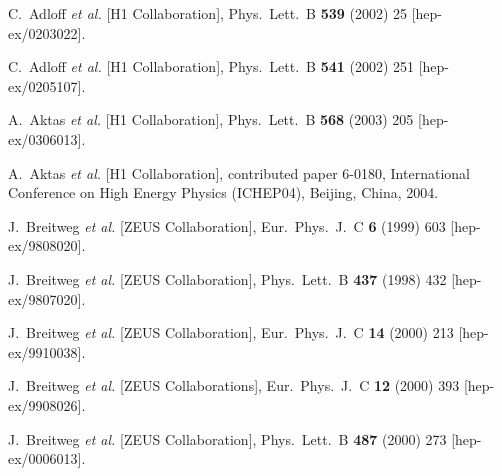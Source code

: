 \begin{thebibliography}{999}
C.~Adloff {\it et al.}  [H1 Collaboration],
Phys.\ Lett.\ B {\bf 539} (2002) 25 
[hep-ex/0203022].

C.~Adloff {\it et al.}  [H1 Collaboration],
Phys.\ Lett.\ B {\bf 541} (2002) 251 
[hep-ex/0205107].

A.~Aktas {\it et al.}  [H1 Collaboration],
Phys.\ Lett.\ B {\bf 568} (2003) 205 
[hep-ex/0306013].

A.~Aktas {\it et al.}  [H1 Collaboration],
contributed paper 6-0180, International Conference 
on High Energy Physics (ICHEP04), Beijing, China, 2004. 


J.~Breitweg {\it et al.}  [ZEUS Collaboration],
Eur.\ Phys.\ J.\ C {\bf 6} (1999) 603 
[hep-ex/9808020].

J.~Breitweg {\it et al.}  [ZEUS Collaboration],
Phys.\ Lett.\ B {\bf 437} (1998) 432 
[hep-ex/9807020].

J.~Breitweg {\it et al.}  [ZEUS Collaboration],
Eur.\ Phys.\ J.\ C {\bf 14} (2000) 213 
[hep-ex/9910038].

J.~Breitweg {\it et al.}  [ZEUS Collaborations],
Eur.\ Phys.\ J.\ C {\bf 12} (2000) 393 
[hep-ex/9908026].

J.~Breitweg {\it et al.}  [ZEUS Collaboration],
Phys.\ Lett.\ B {\bf 487} (2000) 273 
[hep-ex/0006013].


\end{thebibliography}
